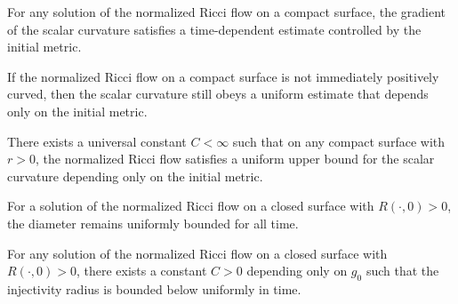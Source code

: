 \begin{lemma}
\label{ch05-lem-gradient-control}

For any solution of the normalized Ricci flow on a compact surface, the gradient of the scalar curvature satisfies a time-dependent estimate controlled by the initial metric.
\end{lemma}

\begin{corollary}
\label{ch05-cor-curvature-decay-away-from-positivity}

If the normalized Ricci flow on a compact surface is not immediately positively curved, then the scalar curvature still obeys a uniform estimate that depends only on the initial metric.
\end{corollary}

\begin{proposition}
\label{ch05-prop-uniform-curvature-bound-positive}

There exists a universal constant \(C<\infty\) such that on any compact surface with \(r>0\), the normalized Ricci flow satisfies a uniform upper bound for the scalar curvature depending only on the initial metric.
\end{proposition}

\begin{proposition}
\label{ch05-prop-diameter-bound-positive}

For a solution of the normalized Ricci flow on a closed surface with \(R(\cdot,0)>0\), the diameter remains uniformly bounded for all time.
\end{proposition}

\begin{corollary}
\label{ch05-cor-injectivity-radius-control}

For any solution of the normalized Ricci flow on a closed surface with \(R(\cdot,0)>0\), there exists a constant \(C>0\) depending only on \(g_0\) such that the injectivity radius is bounded below uniformly in time.
\end{corollary}


